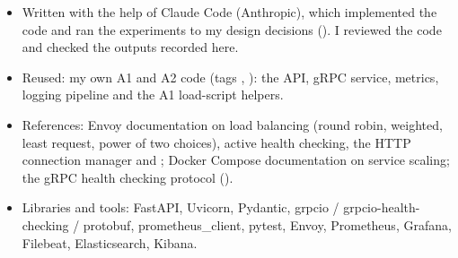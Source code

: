 \documentclass[11pt,a4paper]{article}
\newcommand{\repo}{https://github.com/affan002/ESD_hw3/blob/main}
\newcommand{\file}[1]{\href{\repo/#1}{\path{#1}}}
\begin{document}
\begin{itemize}
  \item Written with the help of Claude Code (Anthropic), which implemented the code and ran the experiments to my design decisions (\file{docs/DECISIONS.md}). I reviewed the code and checked the outputs recorded here.
  \item Reused: my own A1 and A2 code (tags , ): the API, gRPC service, metrics, logging pipeline and the A1 load-script helpers.
  \item References: Envoy documentation on load balancing (round robin, weighted, least request, power of two choices), active health checking, the HTTP connection manager and ; Docker Compose documentation on service scaling; the gRPC health checking protocol ().
  \item Libraries and tools: FastAPI, Uvicorn, Pydantic, grpcio / grpcio-health-checking / protobuf, prometheus\_client, pytest, Envoy, Prometheus, Grafana, Filebeat, Elasticsearch, Kibana.
\end{itemize}
\end{document}
